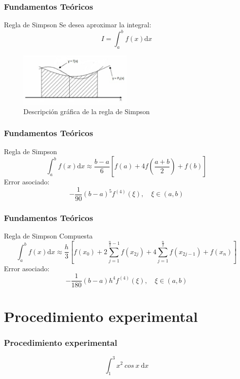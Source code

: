 \documentclass{beamer}
\begin{document}
\begin{frame}
  \frametitle{Fundamentos Teóricos}
  \begin{block}{Regla de Simpson}
    Se desea aproximar la integral:
    \[ I = \int_{a}^{b} f(x) \text{d}x \]
  \begin{figure}[ht]
  \centering
  \includegraphics[width=0.50\textwidth]{img/Grafica_Simpson.eps}
  \caption{Descripción gráfica de la regla de Simpson}
  \label{Grafica_Simpson}
  \end{figure}
  
  \end{block}
 
\end{frame}

\begin{frame}
  \frametitle{Fundamentos Teóricos}
  \begin{block}{Regla de Simpson}
  \[ \int_{a}^{b} f(x) \text{d}x \approx \frac{b-a}{6}\left[f(a) + 4f\left(\frac{a+b}{2}\right) + f(b)\right] \]
  Error asociado:
  \[ -\frac{1}{90}(b-a)^5f^{(4)}(\xi), \quad \xi \in (a,b) \]
  \end{block}
\end{frame}

\begin{frame}
  \frametitle{Fundamentos Teóricos}
  \begin{block}{Regla de Simpson Compuesta}
  \[ \int_{a}^{b}f(x) \text{d}x \approx \frac{h}{3}\left[f(x_0) + 2\sum_{j=1}^{\frac{n}{2}-1} f(x_{2j}) + 
  4\sum_{j=1}^{\frac{n}{2}} f(x_{2j-1}) + f(x_n)\right] \]
  Error asociado:
    \[ -\frac{1}{180}(b-a)h^4f^{(4)}(\xi), \quad \xi \in (a,b) \]
  \end{block}
\end{frame}

\section{Procedimiento experimental}

\begin{frame}
\frametitle{Procedimiento experimental}

\[ \int_{1}^{3} x^2\ cos\ x\ \text{d}x \]

\end{frame}
\end{document}
